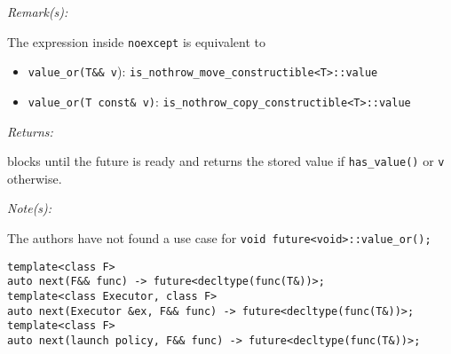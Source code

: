 \documentclass[a4paper,10pt]{article}
\newcommand{\cpp}[1]{\lstinline{#1}}
\newcommand{\wordingItem}[1]{\noindent\textit{#1:}}
\newenvironment{wordingPara}{\begin{adjustwidth}{12pt}{}}{\end{adjustwidth}}
\newenvironment{Returns}{\wordingItem{Returns}\vspace{7pt}\noindent\begin{adjustwidth}{12pt}{}}{\vspace{7pt}\end{adjustwidth}}
\newenvironment{Remarks}{\wordingItem{Remark(s)}\vspace{7pt}\noindent\begin{adjustwidth}{12pt}{}}{\vspace{7pt}\end{adjustwidth}}
\newenvironment{Notes}{\wordingItem{Note(s)}\vspace{7pt}\noindent\begin{adjustwidth}{12pt}{}}{\vspace{7pt}\end{adjustwidth}}
\begin{document}
\begin{wordingPara}
 
\begin{Remarks}
The expression inside \cpp{noexcept} is equivalent to
\begin{itemize}
\item \cpp{value_or(T&& v}): \cpp{is_nothrow_move_constructible<T>::value}
\item \cpp{value_or(T const& v)}: \cpp{is_nothrow_copy_constructible<T>::value}
\end{itemize}
\end{Remarks}

\begin{Returns}
blocks until the future is ready and returns the stored value if \cpp{has_value()} or \cpp{v} otherwise.
\end{Returns}

\begin{Notes}
The authors have not found a use case for  \cpp{void future<void>::value_or();}
\end{Notes}

\end{wordingPara}
\begin{lstlisting}[xleftmargin=0pt]
template<class F> 
auto next(F&& func) -> future<decltype(func(T&))>; 
template<class Executor, class F> 
auto next(Executor &ex, F&& func) -> future<decltype(func(T&))>; 
template<class F> 
auto next(launch policy, F&& func) -> future<decltype(func(T&))>;
\end{lstlisting}
\end{document}
